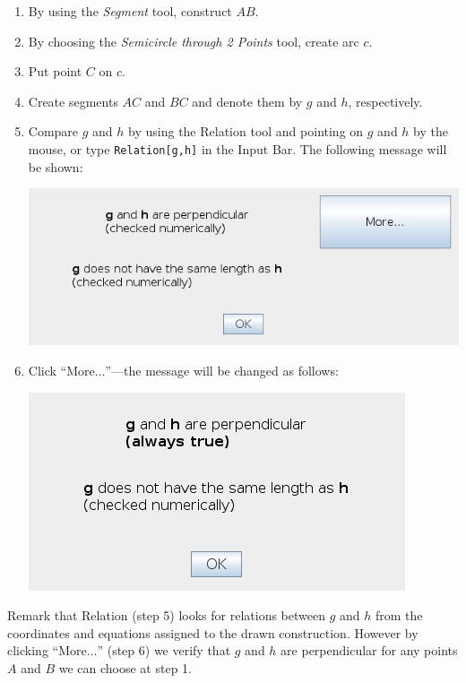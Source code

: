 \documentclass{article}
\begin{document}
\begin{enumerate}
    \item By using the \textit{Segment} tool, construct $AB$.
    \item By choosing the \textit{Semicircle through 2 Points} tool, create arc $c$.
    \item Put point $C$ on $c$.
    \item Create segments $AC$ and $BC$ and denote them by $g$ and $h$, respectively.
    \item Compare $g$ and $h$ by using the Relation tool and pointing on $g$ and $h$ by the mouse, or type \texttt{Relation[g,h]} in the Input Bar. The following message will be shown:
    \begin{center}
    \includegraphics[scale=0.5]{Relation-example-Relation1}
    \end{center}
    \item Click ``More$\ldots$''---the message will be changed as follows:
    \begin{center}
    \includegraphics[scale=0.5]{Relation-example-Relation2}
    \end{center}
    
\end{enumerate}

Remark that Relation (step 5) looks for relations between $g$ and $h$ from the coordinates and equations assigned to the drawn construction. However by clicking ``More$\ldots$'' (step 6) we verify that $g$ and $h$ are perpendicular for any points $A$ and $B$ we can choose at step 1.
\end{document}
